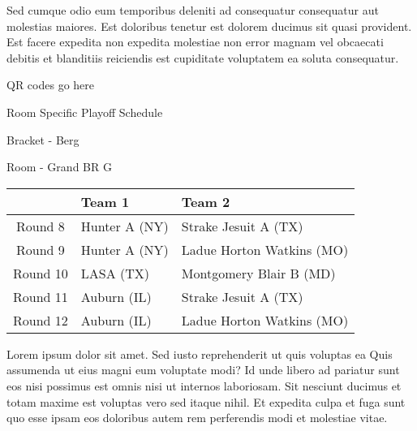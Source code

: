 \documentclass{article}%
\begin{document}
\newline%
Sed cumque odio eum temporibus deleniti ad consequatur consequatur aut molestias maiores. Est doloribus tenetur est dolorem ducimus sit quasi provident. Est facere expedita non expedita molestiae non error magnam vel obcaecati debitis et blanditiis reiciendis est cupiditate voluptatem ea soluta consequatur.%
\vspace*{140pt}%
\begin{center}%
\begin{Huge}%
QR codes go here%
\end{Huge}%
\end{center}%
\newpage%
\begin{center}%
\begin{Huge}%
Room Specific Playoff Schedule%
\end{Huge}%
\vspace*{8pt}%
\linebreak%
\begin{Large}%
Bracket {-} Berg%
\end{Large}%
\vspace*{8pt}%
\linebreak%
\vspace*{8pt}%
\begin{Large}%
Room {-} Grand BR G%
\end{Large}%
\end{center}%
%
\begin{tabularx}{\textwidth}{|c|Y|Y|}%
\hline%
&Team 1&Team 2\\%
\hline%
Round 8&Hunter A (NY)&Strake Jesuit A (TX)\\%
Round 9&Hunter A (NY)&Ladue Horton Watkins (MO)\\%
Round 10&LASA (TX)&Montgomery Blair B (MD)\\%
Round 11&Auburn (IL)&Strake Jesuit A (TX)\\%
Round 12&Auburn (IL)&Ladue Horton Watkins (MO)\\%
\hline%
\end{tabularx}%
\vspace*{8pt}%
\newline%
Lorem ipsum dolor sit amet. Sed iusto reprehenderit ut quis voluptas ea Quis assumenda ut eius magni eum voluptate modi? Id unde libero ad pariatur sunt eos nisi possimus est omnis nisi ut internos laboriosam. Sit nesciunt ducimus et totam maxime est voluptas vero sed itaque nihil. Et expedita culpa et fuga sunt quo esse ipsam eos doloribus autem rem perferendis modi et molestiae vitae.\newline%
\end{document}
